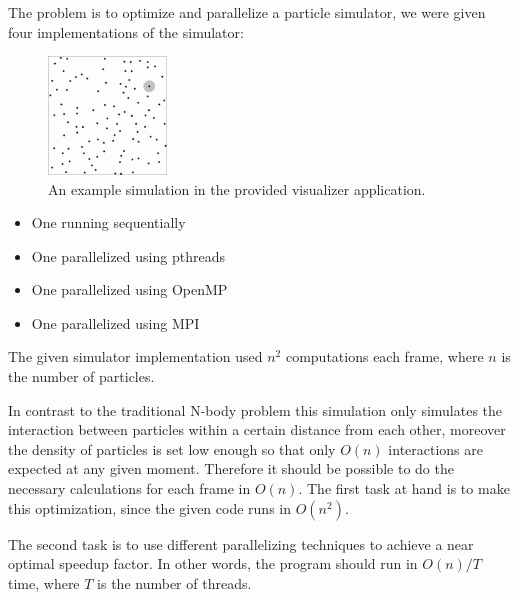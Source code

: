 The problem is to optimize and parallelize a particle simulator, we
were given four implementations of the simulator:

\begin{figure}
    \vspace{-130pt}
    \begin{center}
        \includegraphics[width=0.28\textwidth]{simulator}
    \end{center}
    \caption{An example simulation in the provided visualizer application.}
\end{figure}

\begin{itemize}
     \item One running sequentially
     \item One parallelized using pthreads
     \item One parallelized using OpenMP
     \item One parallelized using MPI
\end{itemize}

The given simulator implementation used $n^2$ computations each frame, where $n$ is the number of particles.

In contrast to the traditional N-body problem this simulation only
simulates the interaction between particles within a certain distance from
each other, moreover the density of particles is set low enough so that
only $O(n)$ interactions are expected at any given moment. Therefore it
should be possible to do the necessary calculations for each frame in
$O(n)$. The first task at hand is to make this optimization, since the given code runs in $O(n^2)$.

The second task is to use different parallelizing techniques to achieve a near optimal speedup factor. In other words, the program should run in $O(n)/T$ time, where $T$ is the number of threads.
